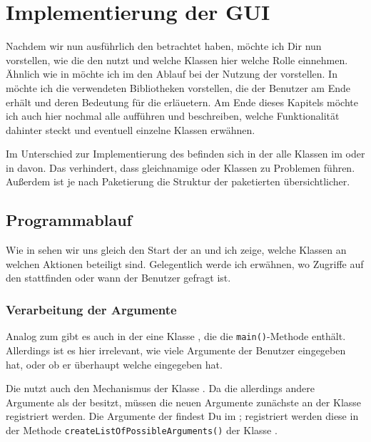 \chapter{Implementierung der GUI}
Nachdem wir nun ausführlich den \md{} betrachtet haben, möchte ich Dir nun vorstellen, wie die \mdg{} den \md{} nutzt und welche Klassen hier welche Rolle einnehmen. Ähnlich wie in  möchte ich im  den Ablauf bei der Nutzung der \mdg{} vorstellen. In  möchte ich die verwendeten Bibliotheken vorstellen, die der Benutzer am Ende erhält und deren Bedeutung für die \mdg{} erläuetern. Am Ende dieses Kapitels möchte ich auch hier nochmal alle \packages{} aufführen und beschreiben, welche Funktionalität dahinter steckt und eventuell einzelne Klassen erwähnen.

Im Unterschied zur Implementierung des \md{} befinden sich in der \mdg{} alle Klassen im \package{}  oder in \subpackages{} davon. Das verhindert, dass gleichnamige \packages{} oder Klassen zu Problemen führen. Außerdem ist je nach Paketierung die Struktur der paketierten \mdg{} übersichtlicher.

\section{Programmablauf}
Wie in  sehen wir uns gleich den Start der \mdg{} an und ich zeige, welche Klassen an welchen Aktionen beteiligt sind. Gelegentlich werde ich erwähnen, wo Zugriffe auf den \md{} stattfinden oder wann der Benutzer gefragt ist.

\subsection{Verarbeitung der Argumente}
Analog zum \md{} gibt es auch in der \mdg{} eine Klasse , die die \texttt{main()}-Methode enthält. Allerdings ist es hier irrelevant, wie viele Argumente der Benutzer eingegeben hat, oder ob er überhaupt welche eingegeben hat.

Die \mdg{} nutzt auch den Mechanismus der Klasse . Da die \mdg{} allerdings andere Argumente als der \md{} besitzt, müssen die neuen Argumente zunächste an der Klasse  registriert werden. Die Argumente der \mdg{} findest Du im \package{} ; registriert werden diese in der Methode \texttt{createListOfPossibleArguments()} der Klasse .

